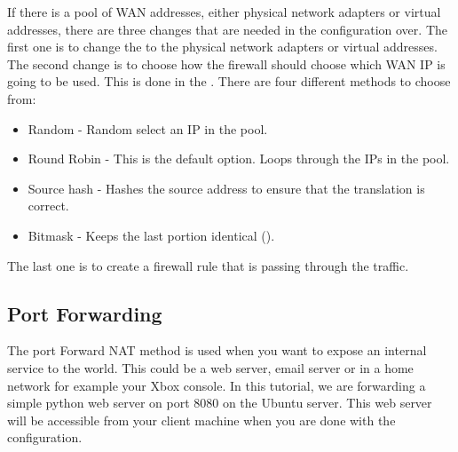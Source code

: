

If there is a pool of WAN addresses, either physical network adapters or virtual addresses, there are three changes that are needed in the configuration over. The first one is to change the  to the physical network adapters or virtual addresses. The second change is to choose how the firewall should choose which WAN IP is going to be used. This is done in the . There are four different methods to choose from:
\begin{itemize}
    \item Random - Random select an IP in the pool.
    \item Round Robin - This is the default option. Loops through the IPs in the pool.
    \item Source hash - Hashes the source address to ensure that the translation is correct.
    \item Bitmask - Keeps the last portion identical ().
\end{itemize}


The last one is to create a firewall rule that is passing through the traffic.

\subsection{Port Forwarding} \label{port_forwarding}
The port Forward NAT method is used when you want to expose an internal service to the world. This could be a web server, email server or in a home network for example your Xbox console. In this tutorial, we are forwarding a simple python web server on port 8080 on the Ubuntu server. This web server will be accessible from your client machine when you are done with the configuration.

